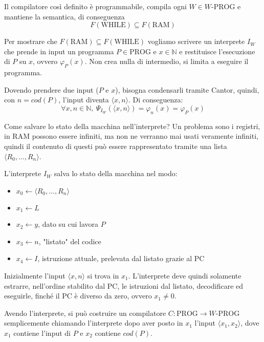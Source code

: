 \documentclass[12pt, answers]{exam}
\theoremstyle{plain}
\newcommand{\prog}{\text{PROG}}
\newcommand{\ram}{\text{RAM}}
\newcommand{\while}{\text{WHILE}}
\newcommand{\wprog}{W\text{-PROG}}
\newcommand{\N}{\mathbb{N}}
\begin{document}
\begin{questions}
\begin{solution}
            Il compilatore così definito è programmabile, compila ogni $W \in \wprog$ e mantiene la semantica, di conseguenza
            $$ F(\while) \subseteq F(\ram) $$
            
            Per mostrare che $F(\ram) \subseteq F(\while)$ vogliamo scrivere un interprete $I_W$ che prende in input un programma $P \in \prog$ e $x \in \N$ e restituisce l'esecuzione di $P$ su $x$, ovvero $\varphi_P (x)$. Non crea nulla di intermedio, si limita a eseguire il programma. 
            
            Dovendo prendere due input ($P$ e $x$), bisogna condensarli tramite Cantor, quindi, con $n = cod(P)$, l'input diventa $\langle x, n \rangle$. Di conseguenza: 
            $$ \forall x, n \in \N, \ \Psi_{I_W} (\langle x, n \rangle) = \varphi_n (x) = \varphi_P (x) $$
            
            Come salvare lo stato della macchina nell'interprete? Un problema sono i registri, in $\ram$ possono essere infiniti, ma non ne verranno mai usati veramente infiniti, quindi il contenuto di questi può essere rappresentato tramite una lista $\langle R_0, \dots, R_n \rangle$.
            
            L'interprete $I_W$ salva lo stato della macchina nel modo: 
            \begin{itemize}
                \item $x_0 \leftarrow \langle R_0, \dots, R_n \rangle$
                
                \item $x_1 \leftarrow L$
                
                \item $x_2 \leftarrow y$, dato su cui lavora $P$
                
                \item $x_3 \leftarrow n$, "listato" del codice
                
                \item $x_4 \leftarrow I$, istruzione attuale, prelevata dal listato grazie al PC
            \end{itemize}
            
            Inizialmente l'input $\langle x, n \rangle$ si trova in $x_1$. L'interprete deve quindi solamente estrarre, nell'ordine stabilito dal PC, le istruzioni dal listato, decodificare ed eseguirle, finché il PC è diverso da zero, ovvero $x_1 \neq 0$.
            
            Avendo l'interprete, si può costruire un compilatore $C: \prog \rightarrow \wprog$ semplicemente chiamando l'interprete dopo aver posto in $x_1$ l'input $\langle x_1, x_2 \rangle$, dove $x_1$ contiene l'input di $P$ e $x_2$ contiene $cod(P)$.
            

\end{solution}
\end{questions}
\end{document}
